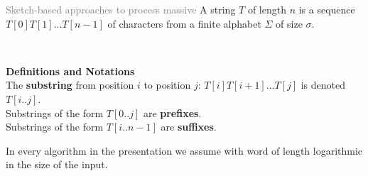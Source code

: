 
\def\stringseashells{S,h,e,\_,s,e,l,l,s,\_,s,e,a,s,h,e,l,l,s,\_,b,y,\_,t,h,e,\_,s,e,a,s,h,o,r,e}
\def\stringstruggled{I, ,s,t,r,u,g,g,l,e,d, ,t,o, ,m,a,k,e, ,t,h,i,s, ,f,i,g,u,r,e, ,w,i,t,h, ,t,i,k,z,!}


\begin{frame}{\textcolor{gray}{Sketch-based approaches to process massive }}
    \pause
    A string $T$ of length $n$ is a sequence $T[0]T[1]...T[n-1]$ of characters from a finite alphabet $\Sigma$ of size $\sigma$.\pause \\
    \begin{center}
        \\
    \end{center}
    \pause
    \textbf{Definitions and Notations}\\
    The \textbf{substring} from position $i$ to position $j$: $T[i]T[i+1]...T[j]$ is denoted $T[i..j]$.\\ \pause
    Substrings of the form $T[0..j]$ are \textbf{prefixes}.\\ \pause
    Substrings of the form $T[i..n-1]$ are \textbf{suffixes}.\\ \pause

    \medskip
    In every algorithm in the presentation we assume  with word of length logarithmic in the size of the input.
\end{frame}

